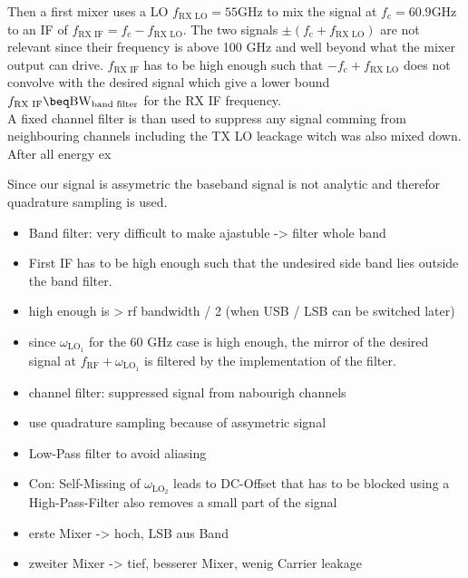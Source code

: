 Then a first mixer uses a \gls{LO} $f_{\text{RX LO}} = 55 \text{GHz}$
to mix the signal at $f_{\text{c}} = 60.9 \text{GHz}$
to an \gls{IF} of $f_{\text{RX IF}} = f_{\text{c}} - f_{\text{RX LO}}$.
The two signals $\pm (f_{\text{c}} + f_{\text{RX LO}})$ are not relevant
since their frequency is above 100 GHz and well beyond what the
mixer output can drive. $f_{\text{RX IF}}$ has to be high enough such
that $-f_{\text{c}} + f_{\text{RX LO}}$ does not convolve with the
desired signal which give a lower bound
$f_{\text{RX IF}} \beq \text{BW}_{\text{band filter}}$ for the \gls{RX}
\gls{IF} frequency. \\

A fixed channel filter is than used to suppress any signal
comming from neighbouring channels including the \gls{TX} \gls{LO}
leackage witch was also mixed down. \\

After all energy ex

Since our signal is assymetric the baseband signal is not analytic and therefor
quadrature sampling is used. \\



\begin{itemize}
\item Band filter: very difficult to make ajastuble -> filter whole band
\item First IF has to be high enough such that the undesired side band lies
  outside the band filter.
\item high enough is > rf bandwidth / 2 (when USB / LSB  can be switched later)
\item since $\omega_{\text{LO}_1}$ for the 60 GHz case is high enough, the mirror
  of the desired signal at $f_{\text{RF}} + \omega_{\text{LO}_1}$ is filtered
  by the implementation of the filter.
\item channel filter: suppressed signal from nabourigh channels
\item use quadrature sampling because of assymetric signal
\item Low-Pass filter to avoid aliasing
\item Con: Self-Missing of $\omega_{\text{LO}_2}$ leads to DC-Offset that has to be blocked using a
  High-Pass-Filter also removes a small part of the signal
\item erste Mixer -> hoch, LSB aus Band
\item zweiter Mixer -> tief, besserer Mixer, wenig Carrier leakage
\end{itemize}

